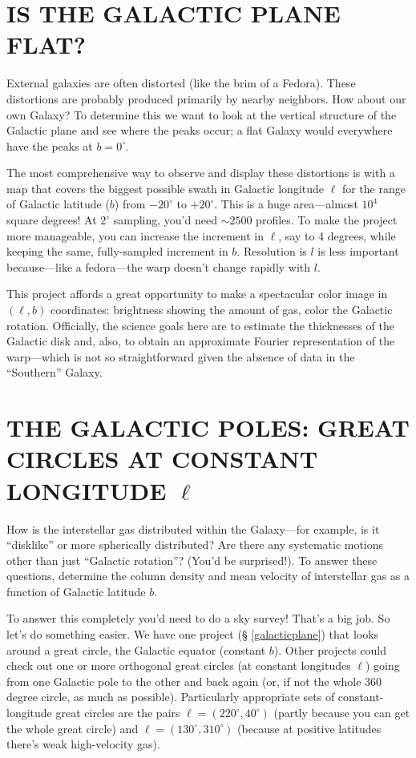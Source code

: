 \documentclass[preprint]{aastex}
\begin{document}
\section{IS THE GALACTIC PLANE FLAT?}

	External galaxies are often distorted (like the brim of a Fedora). 
These distortions are probably produced primarily by nearby neighbors. 
How about our own Galaxy? To determine this we want to look at the
vertical structure of the Galactic plane and see where the peaks occur;
a flat Galaxy would everywhere have the peaks at $b=0^\circ$. 

The most comprehensive way to observe and display these distortions is
with a map that covers the biggest possible swath in Galactic longitude
$\ell$ for the range of Galactic latitude ($b$) from $-20^\circ$ to
$+20^\circ$. This is a huge area---almost $10^4$ square degrees! At
$2^\circ$ sampling, you'd need $\sim 2500$ profiles.  To make the
project more manageable, you can increase the increment in $\ell$, say
to 4 degrees, while keeping the same, fully-sampled increment in
$b$. Resolution is $l$ is less important because---like a
fedora---the warp doesn't change rapidly with $l$.

This project affords a great opportunity to make a spectacular color
image in $(\ell,b)$ coordinates: brightness showing the amount of gas,
color the Galactic rotation.  Officially, the science goals here are to
estimate the thicknesses of the Galactic disk and, also, to obtain an
approximate Fourier representation of the warp---which is not so
straightforward given the absence of data in the ``Southern'' Galaxy.

\section{THE GALACTIC POLES: GREAT CIRCLES AT CONSTANT LONGITUDE $\ell$}
\label{galacticpoles}

How is the interstellar gas distributed within the Galaxy---for example,
is it ``disklike'' or more spherically distributed? Are there any
systematic motions other than just ``Galactic rotation''? (You'd be
surprised!).  To answer these questions, determine the column density
and mean velocity of interstellar gas as a function of Galactic latitude
$b$. 

	To answer this completely you'd need to do a sky survey! That's
a big job.  So let's do something easier. We have one project (\S
\ref{galacticplane}) that looks around a great circle, the Galactic
equator (constant $b$). Other projects could check out one or more
orthogonal great circles (at constant longitudes $\ell$) going from one
Galactic pole to the other and back again (or, if not the whole 360
degree circle, as much as possible).  Particularly appropriate sets of
constant-longitude great circles are the pairs $\ell = (220^\circ,
40^\circ)$ (partly because you can get the whole great circle) and $\ell
= (130^\circ, 310^\circ)$ (because at positive latitudes there's weak
high-velocity gas).
\end{document}
